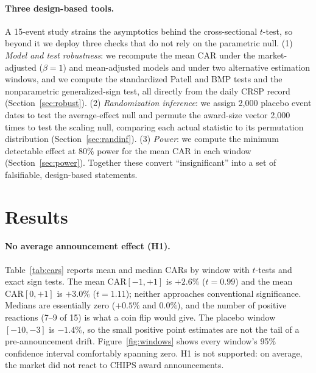 \documentclass[12pt]{article}
\begin{document}
\paragraph{Three design-based tools.} A 15-event study strains the asymptotics behind the
cross-sectional $t$-test, so beyond it we deploy three checks that do not rely on the parametric
null. (1) \emph{Model and test robustness}: we recompute the mean CAR under the market-adjusted
($\beta=1$) and mean-adjusted models and under two alternative estimation windows, and we compute
the standardized Patell and BMP tests and the nonparametric generalized-sign test, all directly
from the daily CRSP record (Section~\ref{sec:robust}). (2) \emph{Randomization inference}: we
assign 2{,}000 placebo event dates to test the average-effect null and permute the award-size
vector 2{,}000 times to test the scaling null, comparing each actual statistic to its permutation
distribution (Section~\ref{sec:randinf}). (3) \emph{Power}: we compute the minimum detectable
effect at 80\% power for the mean CAR in each window (Section~\ref{sec:power}). Together these
convert ``insignificant'' into a set of falsifiable, design-based statements.

\section{Results}\label{sec:res}
\paragraph{No average announcement effect (H1).} Table~\ref{tab:cars} reports mean and
median CARs by window with $t$-tests and exact sign tests. The mean CAR$[-1,+1]$ is
$+2.6\%$ ($t=0.99$) and the mean CAR$[0,+1]$ is $+3.0\%$ ($t=1.11$); neither approaches
conventional significance. Medians are essentially zero ($+0.5\%$ and $0.0\%$), and the
number of positive reactions (7--9 of 15) is what a coin flip would give. The placebo
window $[-10,-3]$ is $-1.4\%$, so the small positive point estimates are not the tail of a
pre-announcement drift. Figure~\ref{fig:windows} shows every window's 95\% confidence
interval comfortably spanning zero. H1 is not supported: on average, the market did not
react to CHIPS award announcements.
\end{document}
